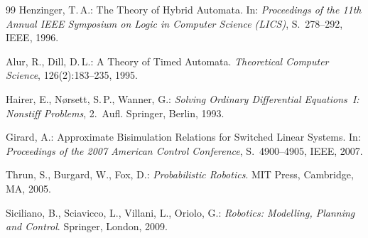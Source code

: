 ﻿\documentclass[a4paper,12pt]{article}
\theoremstyle{definition}
\begin{document}
\begin{thebibliography}{99}
Henzinger, T.\,A.:
The Theory of Hybrid Automata.
In: \textit{Proceedings of the 11th Annual IEEE Symposium on Logic in Computer Science (LICS)}, S.~278--292, IEEE, 1996.

Alur, R., Dill, D.\,L.:
A Theory of Timed Automata.
\textit{Theoretical Computer Science}, 126(2):183--235, 1995.

Hairer, E., N{\o}rsett, S.\,P., Wanner, G.:
\textit{Solving Ordinary Differential Equations~I: Nonstiff Problems}, 2.~Aufl.
Springer, Berlin, 1993.

Girard, A.:
Approximate Bisimulation Relations for Switched Linear Systems.
In: \textit{Proceedings of the 2007 American Control Conference}, S.~4900--4905, IEEE, 2007.

Thrun, S., Burgard, W., Fox, D.:
\textit{Probabilistic Robotics}.
MIT Press, Cambridge, MA, 2005.

Siciliano, B., Sciavicco, L., Villani, L., Oriolo, G.:
\textit{Robotics: Modelling, Planning and Control}.
Springer, London, 2009.

\end{thebibliography}
\end{document}

